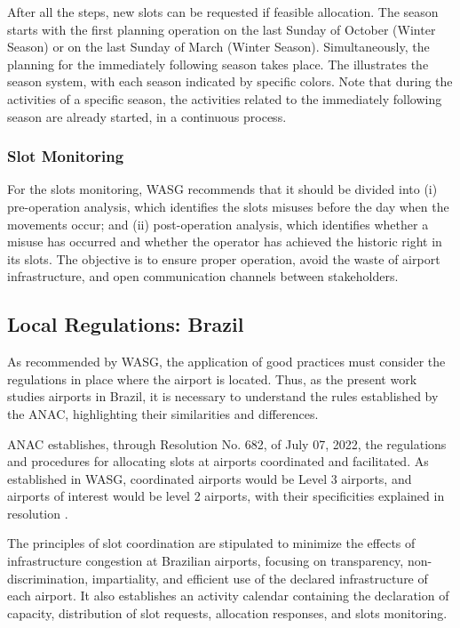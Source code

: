 After all the steps, new slots can be requested if feasible allocation. The season starts with the first planning operation on the last Sunday of October (Winter Season) or on the last Sunday of March (Winter Season). Simultaneously, the planning for the immediately following season takes place. The  illustrates the season system, with each season indicated by specific colors. Note that during the activities of a specific season, the activities related to the immediately following season are already started, in a continuous process.

%

\subsubsection{Slot Monitoring}

For the slots monitoring, \acrshort{WASG} recommends that it should be divided into (i) pre-operation analysis, which identifies the slots misuses before the day when the movements occur; and (ii) post-operation analysis, which identifies whether a misuse has occurred and whether the operator has achieved the historic right in its slots. The objective is to ensure proper operation, avoid the waste of airport infrastructure, and open communication channels between stakeholders.

\subsection{Local Regulations: Brazil}

As recommended by \acrshort{WASG}, the application of good practices must consider the regulations in place where the airport is located. Thus, as the present work studies airports in Brazil, it is necessary to understand the rules established by the \acrshort{ANAC}, highlighting their similarities and differences.

\acrshort{ANAC} establishes, through Resolution No. 682, of July 07, 2022, the regulations and procedures for allocating slots at airports coordinated and facilitated. As established in \acrshort{WASG}, coordinated airports would be Level 3 airports, and airports of interest would be level 2 airports, with their specificities explained in resolution \cite{ANAC682}.

The principles of slot coordination are stipulated to minimize the effects of infrastructure congestion at Brazilian airports, focusing on transparency, non-discrimination, impartiality, and efficient use of the declared infrastructure of each airport. It also establishes an activity calendar containing the declaration of capacity, distribution of slot requests, allocation responses, and slots monitoring.


